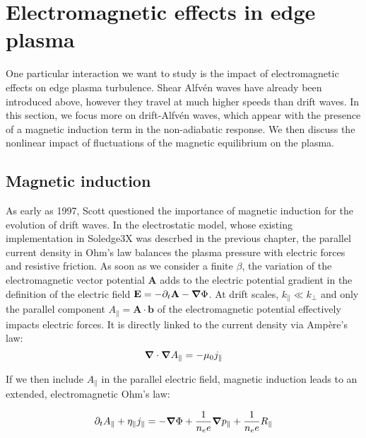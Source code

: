 \section{Electromagnetic effects in edge plasma}
\label{sec:edge_EMeffects}

One particular interaction we want to study is the impact of electromagnetic effects on edge plasma turbulence. Shear Alfvén waves have already been introduced above, however they travel at much higher speeds than drift waves. In this section, we focus more on drift-Alfvén waves, which appear with the presence of a magnetic induction term in the non-adiabatic response. We then discuss the nonlinear impact of fluctuations of the magnetic equilibrium on the plasma.


\subsection{Magnetic induction}

As early as 1997, Scott\cite{scott1997} questioned the importance of magnetic induction for the evolution of drift waves. In the electrostatic model, whose existing implementation in Soledge3X was descrbed in the previous chapter, the parallel current density in Ohm's law balances the plasma pressure with electric forces and resistive friction. As soon as we consider a finite $\beta$, the variation of the electromagnetic vector potential $\mathbf{A}$ adds to the electric potential gradient in the definition of the electric field $ \mathbf{E} = -\partial_t \mathbf{A} - \grad \Phi$. At drift scales, $k_\parallel \ll k_\perp$ and only the parallel component $A_\parallel = \mathbf{A}\cdot\mathbf{b}$ of the electromagnetic potential effectively impacts electric forces. It is directly linked to the current density via Ampère's law: 
\begin{equation}
	\label{eq:AmpereLaw}
	\grad\cdot\grad A_\parallel = -\mu_0 j_\parallel
\end{equation}

If we then include $A_\parallel$ in the parallel electric field, magnetic induction leads to an extended, electromagnetic Ohm's law:

\begin{equation}
	\label{eq:electromagneticOhmsLaw}
	\partial_t A_\parallel + \eta_\parallel j_\parallel = -\grad\Phi + \frac{1}{n_ee}\grad p_\parallel + \frac{1}{n_ee}R_\parallel
\end{equation}

